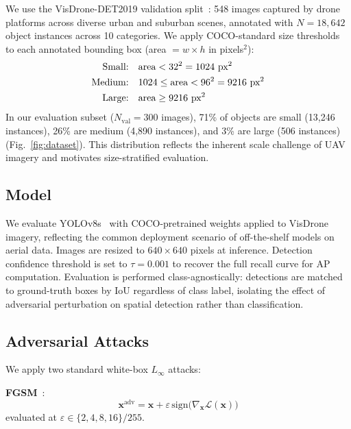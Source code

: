 \documentclass[journal]{IEEEtran}
\begin{document}
We use the VisDrone-DET2019 validation split~\cite{visDrone2019}:
548 images captured by drone platforms across diverse urban and
suburban scenes, annotated with $N=18{,}642$ object instances
across 10 categories.
We apply COCO-standard size thresholds to each annotated bounding
box (area $= w \times h$ in pixels$^2$):
\begin{align}
  \text{Small:}  & \quad \text{area} < 32^2 = 1024\ \text{px}^2 \notag\\
  \text{Medium:} & \quad 1024 \leq \text{area} < 96^2 = 9216\ \text{px}^2 \notag\\
  \text{Large:}  & \quad \text{area} \geq 9216\ \text{px}^2 \notag
\end{align}
In our evaluation subset ($N_\text{val}=300$ images),
71\% of objects are small (13,246 instances),
26\% are medium (4,890 instances), and
3\% are large (506 instances) (Fig.~\ref{fig:dataset}).
This distribution reflects the inherent scale challenge of
UAV imagery and motivates size-stratified evaluation.

\subsection{Model}

We evaluate YOLOv8s~\cite{yolov8ultralytics} with COCO-pretrained
weights applied to VisDrone imagery, reflecting the common
deployment scenario of off-the-shelf models on aerial data.
Images are resized to $640 \times 640$ pixels at inference.
Detection confidence threshold is set to $\tau = 0.001$
to recover the full recall curve for AP computation.
Evaluation is performed class-agnostically: detections are
matched to ground-truth boxes by IoU regardless of class label,
isolating the effect of adversarial perturbation on spatial
detection rather than classification.

\subsection{Adversarial Attacks}

We apply two standard white-box $L_\infty$ attacks:

\textbf{FGSM}~\cite{goodfellow2015fgsm}:
\begin{equation}
  \mathbf{x}^\text{adv} = \mathbf{x}
    + \varepsilon\,\text{sign}\!\bigl(\nabla_\mathbf{x}
      \mathcal{L}(\mathbf{x})\bigr)
\end{equation}
evaluated at $\varepsilon \in \{2,4,8,16\}/255$.
\end{document}
